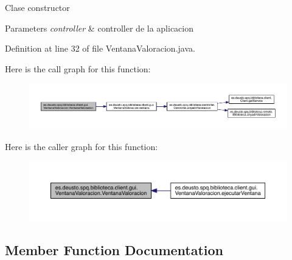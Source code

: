 Clase constructor 
\begin{DoxyParams}{Parameters}
{\em controller} & controller de la aplicacion \\
\hline
\end{DoxyParams}


Definition at line 32 of file Ventana\+Valoracion.\+java.

Here is the call graph for this function\+:
\nopagebreak
\begin{figure}[H]
\begin{center}
\leavevmode
\includegraphics[width=350pt]{classes_1_1deusto_1_1spq_1_1biblioteca_1_1client_1_1gui_1_1_ventana_valoracion_a00caacf21e8061e9838ab07c295edc07_cgraph}
\end{center}
\end{figure}
Here is the caller graph for this function\+:
\nopagebreak
\begin{figure}[H]
\begin{center}
\leavevmode
\includegraphics[width=350pt]{classes_1_1deusto_1_1spq_1_1biblioteca_1_1client_1_1gui_1_1_ventana_valoracion_a00caacf21e8061e9838ab07c295edc07_icgraph}
\end{center}
\end{figure}


\subsection{Member Function Documentation}
\mbox{\label{classes_1_1deusto_1_1spq_1_1biblioteca_1_1client_1_1gui_1_1_ventana_valoracion_a845618b09860a4932b3a818db7e5ddb4}} 
